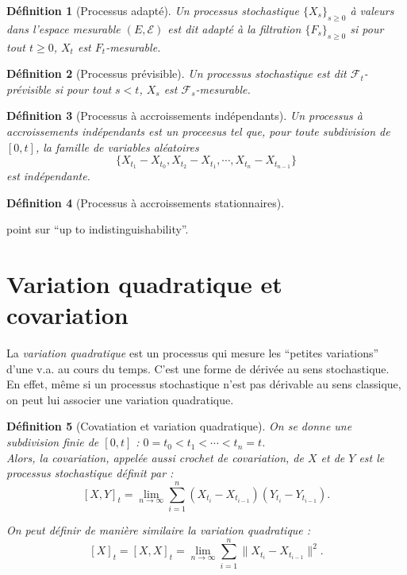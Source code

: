 \documentclass[openany]{book}
\newcommand{\F}{\mathscr{F}}
\newcommand{\carE}{\mathscr{E}}
\theoremstyle{thmfont}
\theoremstyle{deffont}
\newtheorem{definition}[definition]{Définition}
\theoremstyle{thmfont}
\theoremstyle{deffont}
\begin{document}

\begin{definition}[Processus adapté] Un processus stochastique $\{X_s\}_{s\ge0}$ à valeurs dans l'espace mesurable $(E, \carE)$ est dit \textit{adapté} à la filtration $\{F_s\}_{s\geq0}$ si pour tout $t\geq0$, $X_t$ est $F_t$-mesurable.
\label{def:pr_adapte}
\end{definition}

\begin{definition}[Processus prévisible] Un processus stochastique est dit $\F_t$-\textit{prévisible} si pour tout $s < t$, $X_s$ est $\F_s$-mesurable.
\label{def:pr_previsible}
\end{definition}


\begin{definition}[Processus à accroissements indépendants]
  \label{def:pr_accr_indep} Un processus à \textit{accroissements indépendants} est un proceesus tel que, pour toute subdivision de $[0,t]$, la famille de variables aléatoires
    $$\{X_{t_1} - X_{t_0}, X_{t_2} - X_{t_1}, \cdots ,X_{t_n} - X_{t_{n-1}}\}$$
    est indépendante.
\end{definition}

{\color{red}
\begin{definition}[Processus à accroissements stationnaires]
        \label{def:pr_accr_sta}

\end{definition}
    
  point sur ``up to indistinguishability''.
}

\section{Variation quadratique et covariation}

La \textit{variation quadratique} est un processus qui mesure les ``petites variations'' d'une v.a. au cours du temps. C'est une forme de dérivée au sens stochastique. En effet, même si un processus stochastique n'est pas dérivable au sens classique, on peut lui associer une variation quadratique. 

\begin{definition}[Covatiation et variation quadratique] On se donne une subdivision finie de $[0,t]$ :  $0 = t_0 < t_1 < \cdots < t_n = t$.\\
  Alors, la \textit{covariation}, appelée aussi \textit{crochet de covariation}, de $X$ et de $Y$ est le processus stochastique définit par :
  $$[X,Y]_t = \lim_{n\to \infty} \sum_{i = 1}^n(X_{t_i} - X_{t_{i-1}})(Y_{t_i} - Y_{t_{i-1}}).$$

 On peut définir de manière similaire la \textit{variation quadratique} :
 $$[X]_t = [X,X]_t = \lim_{n\to \infty} \sum_{i = 1}^n\|X_{t_i} - X_{t_{i-1}}\|^2.$$
\label{def:crochet}
\end{definition}
\end{document}
